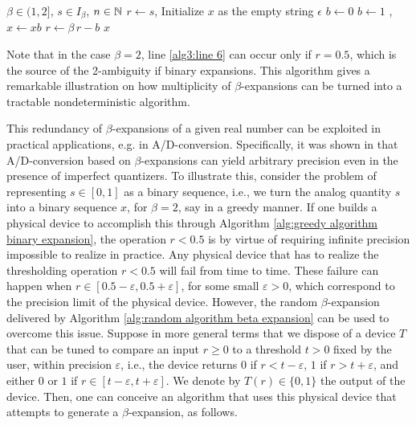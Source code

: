 	\begin{algorithm}[ht]
		\caption{Random $\beta$-expansion algorithm}\label{alg:random algorithm beta expansion}
		\begin{algorithmic}[1]
			\Require $\beta \in (1,2]$, $s \in I_\beta$, $n\in\mathbb{N}$
			\State $r \gets s$, 
			\State Initialize $x$ as the empty string $\epsilon$
				 $b \gets 0$  \label{alg3:line 4}
				  $b \gets 1$
				,  \label{alg3:line 6}
				\EndIf
				\State $x \gets xb$
				\State $r \gets \beta \, r -  b$
			\EndFor
			\State \Return $x$
		\end{algorithmic}
	\end{algorithm}
	Note that in the case $\beta=2$, line \ref{alg3:line 6} can occur only if $r = 0.5$, which is the source of the 2-ambiguity if binary expansions. This algorithm gives a remarkable illustration on how multiplicity of $\beta$-expansions can be turned into a tractable nondeterministic algorithm.

  This redundancy of $\beta$-expansions of a given real number can be exploited in practical applications, e.g. in A/D-conversion. Specifically, it was shown in \cite{daubechies2006imperfect} that A/D-conversion based on $\beta$-expansions can yield arbitrary precision even in the presence of imperfect quantizers. To illustrate this, consider the problem of representing $s \in [0,1]$ as a binary sequence, i.e., we turn the analog quantity $s$ into a binary sequence $x$, for $\beta = 2$, say in a greedy manner. If one builds a physical device to accomplish this through Algorithm \ref{alg:greedy algorithm binary expansion}, the operation $r < 0.5$ is by virtue of requiring infinite precision impossible to realize in practice. Any physical device that has to realize the thresholding operation $r<0.5$ will fail from time to time. These failure can happen when $r \in [0.5 - \varepsilon, 0.5 + \varepsilon]$, for some small $\varepsilon > 0$, which correspond to the precision limit of the physical device. However, the random $\beta$-expansion delivered by Algorithm \ref{alg:random algorithm beta expansion} can be used to overcome this issue. Suppose in more general terms that we dispose of a device $T$ that can be tuned to compare an input $r \geq 0$ to a threshold $t>0$ fixed by the user, within precision $\varepsilon$, i.e., the device returns $0$ if $r < t - \varepsilon$, $1$ if $r > t + \varepsilon$, and either $0$ or $1$ if $r \in [t - \varepsilon, t + \varepsilon]$. We denote by $T(r) \in \{0,1\}$ the output of the device. Then, one can conceive an algorithm that uses this physical device that attempts to generate a $\beta$-expansion, as follows.

